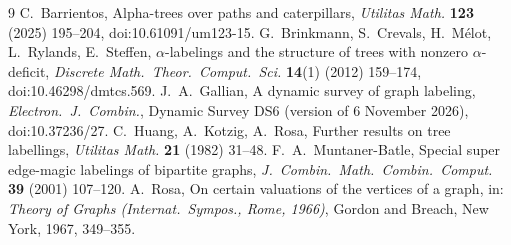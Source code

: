 \documentclass[11pt]{amsart}
\theoremstyle{definition}
\begin{document}
\begin{thebibliography}{9}
 C.~Barrientos, Alpha-trees over paths and caterpillars, \emph{Utilitas Math.} \textbf{123}
  (2025) 195--204, doi:10.61091/um123-15.
 G.~Brinkmann, S.~Crevals, H.~M\'elot, L.~Rylands, E.~Steffen, $\alpha$-labelings and the structure
  of trees with nonzero $\alpha$-deficit, \emph{Discrete Math.\ Theor.\ Comput.\ Sci.} \textbf{14}(1) (2012)
  159--174, doi:10.46298/dmtcs.569.
 J.~A.~Gallian, A dynamic survey of graph labeling, \emph{Electron.\ J.\ Combin.}, Dynamic Survey
  DS6 (version of 6 November 2026), doi:10.37236/27.
 C.~Huang, A.~Kotzig, A.~Rosa, Further results on tree labellings, \emph{Utilitas Math.} \textbf{21}
  (1982) 31--48.
 F.~A.~Muntaner-Batle, Special super edge-magic labelings of bipartite graphs, \emph{J.\
  Combin.\ Math.\ Combin.\ Comput.} \textbf{39} (2001) 107--120.
\bibitem{rosa} A.~Rosa, On certain valuations of the vertices of a graph, in: \emph{Theory of Graphs (Internat.\
  Sympos., Rome, 1966)}, Gordon and Breach, New York, 1967, 349--355.
\end{thebibliography}
\end{document}
